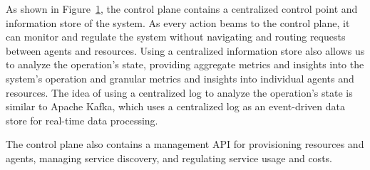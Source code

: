 \documentclass[a4paper,twocolumn,11pt]{quantumarticle}
\begin{document}
\begin{figure}[t]
  \label{fig:control_plane}
\end{figure}
As shown in Figure~\ref{fig:control_plane}, the control plane contains a centralized control point and information store of the system. As every action beams to the control plane, it can monitor and regulate the system without navigating and routing requests between agents and resources. Using a centralized information store also allows us to analyze the operation's state, providing aggregate metrics and insights into the system's operation and granular metrics and insights into individual agents and resources. The idea of using a centralized log to analyze the operation's state is similar to Apache Kafka\cite{kreps2011kafka}, which uses a centralized log as an event-driven data store for real-time data processing.

The control plane also contains a management API for provisioning resources and agents, managing service discovery, and regulating service usage and costs.

\end{document}
